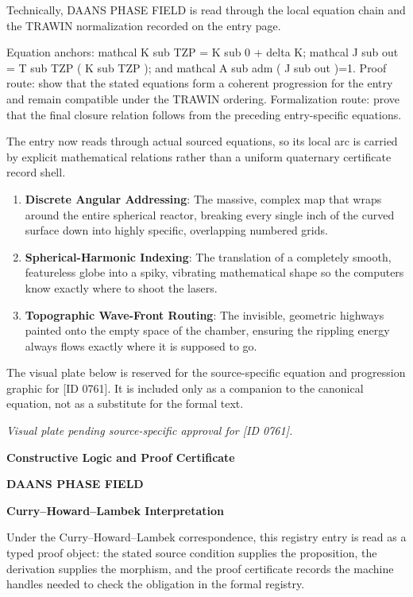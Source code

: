 Technically, DAANS PHASE FIELD is read through the local equation chain and the TRAWIN normalization recorded on the entry page.

Equation anchors: mathcal K sub TZP = K sub 0 + delta K; mathcal J sub out = T sub TZP ( K sub TZP ); and mathcal A sub adm ( J sub out )=1. Proof route: show that the stated equations form a coherent progression for the entry and remain compatible under the TRAWIN ordering. Formalization route: prove that the final closure relation follows from the preceding entry-specific equations.

The entry now reads through actual sourced equations, so its local arc is carried by explicit mathematical relations rather than a uniform quaternary certificate record shell.
\endgroup

\begin{enumerate}[leftmargin=1.6em,itemsep=6pt,topsep=4pt]
\item \textbf{Discrete Angular Addressing}: The massive, complex map that wraps around the entire spherical reactor, breaking every single inch of the curved surface down into highly specific, overlapping numbered grids.
\item \textbf{Spherical-Harmonic Indexing}: The translation of a completely smooth, featureless globe into a spiky, vibrating mathematical shape so the computers know exactly where to shoot the lasers.
\item \textbf{Topographic Wave-Front Routing}: The invisible, geometric highways painted onto the empty space of the chamber, ensuring the rippling energy always flows exactly where it is supposed to go.
\end{enumerate}

\begingroup\footnotesize\sloppy
The visual plate below is reserved for the source-specific equation and progression graphic for [ID 0761]. It is included only as a companion to the canonical equation, not as a substitute for the formal text.
\par\endgroup
\begingroup\footnotesize\itshape
Visual plate pending source-specific approval for [ID 0761].
\par\endgroup

\clearpage
\begingroup\tzpsupportsetup
\noindent\textbf{\fontsize{10.8pt}{12.8pt}\selectfont [ID 0761] Constructive Logic and Proof Certificate}\par
\noindent\textbf{\fontsize{10pt}{12pt}\selectfont DAANS PHASE FIELD}\par
\vspace{0.45em}
\begingroup
\footnotesize
\setlength{\parskip}{0.22em}
\setlength{\parindent}{0pt}
\noindent\textbf{Curry--Howard--Lambek Interpretation}\par
Under the Curry--Howard--Lambek correspondence, this registry entry is read as a typed proof
object: the stated source condition supplies the proposition, the derivation supplies the
morphism, and the proof certificate records the machine handles needed to check the obligation
in the formal registry.

